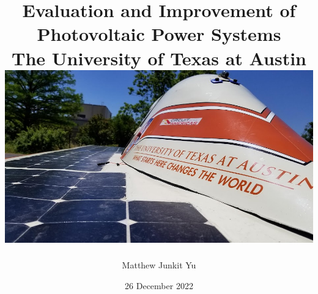 \documentclass[12pt]{report}
\begin{document}
\title {
    {Evaluation and Improvement of Photovoltaic Power Systems}\\
    {\large The University of Texas at Austin}\\
    {\includegraphics[width=\textwidth]{lonestar_cover.jpg}}
}
\author{Matthew Junkit Yu}
\date{26 December 2022}
\maketitle

{
    \hypersetup{linkcolor=black}
    \tableofcontents
    \listoffigures
    \listoftables
}






{
    \hypersetup{linkcolor=black}
    \printbibliography[heading=bibintoc]
    \begin{appendices}
        
        
        
        
        
        
    \end{appendices}
    \listoftodos[TODOS]
}
\end{document}
